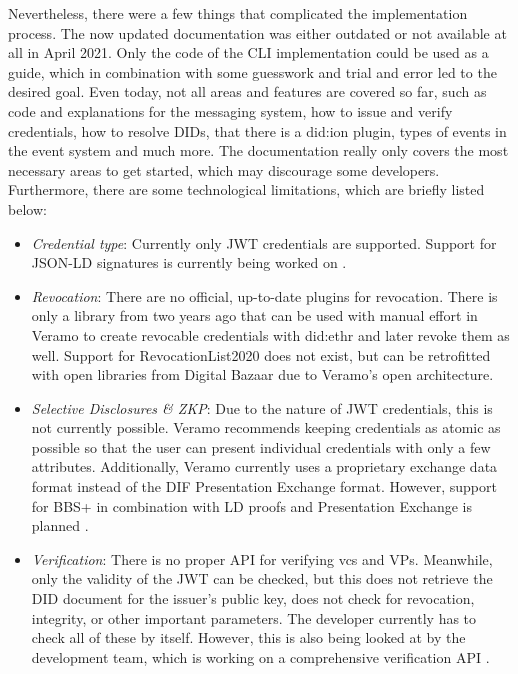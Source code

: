         Nevertheless, there were a few things that complicated the implementation process. The now updated documentation was either outdated or not available at all in April 2021. Only the code of the \ac{CLI} implementation could be used as a guide, which in combination with some guesswork and trial and error led to the desired goal. Even today, not all areas and features are covered so far, such as code and explanations for the messaging system, how to issue and verify credentials, how to resolve \acp{DID}, that there is a did:ion plugin, types of events in the event system and much more. The documentation really only covers the most necessary areas to get started, which may discourage some developers. Furthermore, there are some technological limitations, which are briefly listed below:
    
\begin{itemize}
    \item \textit{Credential type}: Currently only JWT credentials are supported. Support for JSON-LD signatures is currently being worked on \cite{terbu_tracking_2021}.
    \item \textit{Revocation}: There are no official, up-to-date plugins for revocation. There is only a library from two years ago that can be used with manual effort in Veramo to create revocable credentials with did:ethr and later revoke them as well. Support for RevocationList2020 does not exist, but can be retrofitted with open libraries from Digital Bazaar due to Veramo's open architecture.
    \item \textit{Selective Disclosures \& \ac{ZKP}}: Due to the nature of JWT credentials, this is not currently possible. Veramo recommends keeping credentials as atomic as possible so that the user can present individual credentials with only a few attributes. Additionally, Veramo currently uses a proprietary exchange data format instead of the DIF Presentation Exchange format. However, support for BBS+ in combination with LD proofs and Presentation Exchange is planned \cite{terbu_tracking_2021}.
    \item \textit{Verification}: There is no proper API for verifying \acp{vc} and \acp{VP}. Meanwhile, only the validity of the JWT can be checked, but this does not retrieve the \ac{DID} document for the issuer's public key, does not check for revocation, integrity, or other important parameters. The developer currently has to check all of these by itself. However, this is also being looked at by the development team, which is working on a comprehensive verification API \cite{riedel_generalized_2021}.
\end{itemize}

